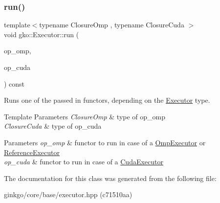 \subsubsection{\texorpdfstring{run()}{run()}\hspace{0.1cm}{\footnotesize\ttfamily [2/2]}}
{\footnotesize\ttfamily template$<$typename Closure\+Omp , typename Closure\+Cuda $>$ \\
void gko\+::\+Executor\+::run (\begin{DoxyParamCaption}\item[{const Closure\+Omp \&}]{op\+\_\+omp,  }\item[{const Closure\+Cuda \&}]{op\+\_\+cuda }\end{DoxyParamCaption}) const\hspace{0.3cm}{\ttfamily [inline]}}



Runs one of the passed in functors, depending on the \hyperlink{classgko_1_1Executor}{Executor} type. 


\begin{DoxyTemplParams}{Template Parameters}
{\em Closure\+Omp} & type of op\+\_\+omp \\
\hline
{\em Closure\+Cuda} & type of op\+\_\+cuda\\
\hline
\end{DoxyTemplParams}

\begin{DoxyParams}{Parameters}
{\em op\+\_\+omp} & functor to run in case of a \hyperlink{classgko_1_1OmpExecutor}{Omp\+Executor} or \hyperlink{classgko_1_1ReferenceExecutor}{Reference\+Executor} \\
\hline
{\em op\+\_\+cuda} & functor to run in case of a \hyperlink{classgko_1_1CudaExecutor}{Cuda\+Executor} \\
\hline
\end{DoxyParams}


The documentation for this class was generated from the following file\+:\begin{DoxyCompactItemize}
\item 
ginkgo/core/base/executor.\+hpp (c71510aa)\end{DoxyCompactItemize}
